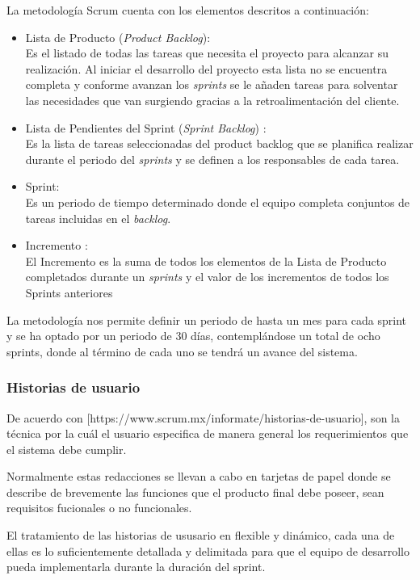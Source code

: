 \noindent La metodología Scrum cuenta con los elementos descritos a continuación:

\begin{itemize}
	\item Lista de Producto (\textit{Product Backlog}):\\
	Es el listado de todas las tareas que necesita el proyecto para alcanzar su realización. Al iniciar el desarrollo del
	proyecto esta lista no se encuentra completa y conforme avanzan los \textit{sprints} se le añaden tareas para solventar las necesidades que	van surgiendo gracias a la retroalimentación del cliente.
	\item Lista de Pendientes del Sprint (\textit{Sprint Backlog}) : \\
	Es la lista de tareas seleccionadas del product backlog que se planifica realizar durante el periodo del \textit{sprints} y se definen a los responsables de cada tarea.
	\item Sprint:\\
	Es un periodo de tiempo determinado donde el equipo completa conjuntos de tareas incluidas en el \textit{backlog}.
	\item Incremento : \\
	El Incremento es la suma de todos los elementos de la Lista de Producto completados durante un \textit{sprints} y el valor de los incrementos de todos los Sprints anteriores
\end{itemize}

La metodología nos permite definir un periodo de hasta un mes para cada sprint y se ha optado por un periodo de 30 días, contemplándose un total de ocho sprints, donde al término de cada uno se tendrá un avance del sistema.

\subsubsection{Historias de usuario}

De acuerdo con [https://www.scrum.mx/informate/historias-de-usuario], son la técnica por la cuál el usuario especifica de manera general
los requerimientos que el sistema debe cumplir.


Normalmente estas redacciones se llevan a cabo en tarjetas de papel donde se describe de brevemente las funciones que el producto final
debe poseer, sean requisitos fucionales o no funcionales.


El tratamiento de las historias de ususario en flexible y dinámico, cada una de ellas es lo suficientemente detallada y delimitada para que el equipo de desarrollo pueda implementarla durante la duración del sprint. 

